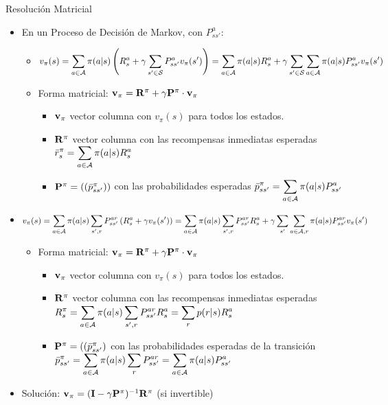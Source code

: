 \documentclass[10pt, envcountsect, handout, aspectratio=1610, hyperref={hypertexnames=true}]{beamer}
\begin{document}
\begin{frame}{Resolución Matricial}

\begin{itemize}
	\item En un Proceso de Decisión de Markov, con $P_{ss'}^a$:
	\begin{itemize}
	\item $\displaystyle v_\pi(s) = \sum_{a\in{\cal A}} \pi(a|s) \left( R^{a}_s + \gamma \sum_{s'\in{\cal S}} P^{a}_{ss'} v_\pi(s') \right) = \sum_{a\in{\cal A}} \pi(a|s)  R^{a}_s + \gamma  \sum_{s'\in{\cal S}} \sum_{a\in{\cal A}} \pi(a|s) P^{a}_{ss'} v_\pi(s')  $
	\item Forma matricial: $\mathbf{v}_\pi = \mathbf{R}^\pi+ \gamma \mathbf{P}^\pi \cdot \mathbf{v}_\pi $
		\begin{itemize}
		\item $\mathbf{v}_\pi$ vector columna con $v_\pi(s)$ para todos los estados. 
		\item $\mathbf{R}^{\pi}$ vector columna con las recompensas inmediatas esperadas $\displaystyle \bar{r}_s^\pi = \sum_{a\in {\cal A}} \pi(a|s) R_s^a$
		\item $\mathbf{P}^{\pi}= ((\bar{p}_{ss'}^{\pi}))$ con las probabilidades esperadas $\displaystyle \bar{p}_{ss'}^{\pi} = \sum_{a\in {\cal A}} \pi(a|s) P_{ss'}^a$
		\end{itemize}
	\end{itemize}
	
\item $\displaystyle v_\pi(s)   = \sum_{a\in{\cal A}} \pi(a|s) \sum_{s',r} P_{ss'}^{ar} \left( R_s^a + \gamma v_\pi(s') \right)
 = \sum_{a\in{\cal A}} \pi(a|s) \sum_{s',r} P_{ss'}^{ar} R_s^a +  \gamma \sum_{s'} \sum_{a\in{\cal A}, r} \pi(a|s)   P_{ss'}^{ar} v_\pi(s')$
\begin{itemize}
	\item Forma matricial: $\mathbf{v}_\pi = \mathbf{R}^\pi+ \gamma \mathbf{P}^\pi \cdot \mathbf{v}_\pi $
		\begin{itemize}
		\item $\mathbf{v}_\pi$ vector columna con $v_\pi(s)$ para todos los estados. 
		\item $\mathbf{R}^{\pi}$ vector columna con las recompensas inmediatas esperadas $\displaystyle R_s^\pi=\sum_{a\in{\cal A}} \pi(a|s) \sum_{s',r} P_{ss'}^{ar} R_s^a = \sum_r p(r|s) R_s^a$
		\item $\mathbf{P}^{\pi}= ((\bar{p}_{ss'}^{\pi})$ con las probabilidades esperadas de la transición $\displaystyle \bar{p}_{ss'}^{\pi} = \sum_{a\in {\cal A}} \pi(a|s) \sum_{r} P_{ss'}^{ar} =\sum_{a\in {\cal A}} \pi(a|s) P_{ss'}^a$
		\end{itemize}
\end{itemize}

\item Solución: $\mathbf{v_\pi} = (\mathbf{I} - \gamma \mathbf{P}^\pi)^{-1} \mathbf{R}^\pi$ (si invertible)

\end{itemize}

\end{frame}
\end{document}
